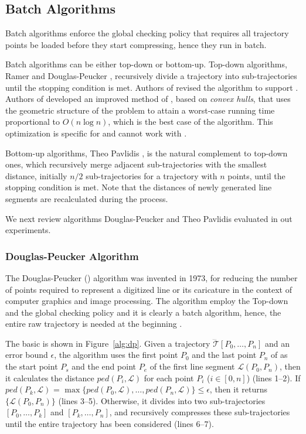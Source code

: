 \subsection{Batch Algorithms}

Batch algorithms enforce the global checking policy that requires all trajectory points be loaded before they start compressing, hence they run in batch.

Batch algorithms can be either top-down or bottom-up.
Top-down algorithms, \eg Ramer \cite{Ramer:Split} and Douglas-Peucker \cite{Douglas:Peucker}, recursively divide a trajectory into sub-trajectories until the stopping condition is met.
Authors of \cite{Meratnia:Spatiotemporal} revised the \dpa algorithm to support \sed.
Authors of \cite{Hershberger:Speeding} developed an improved method of \dpa, based on \emph{convex hulls}, that uses the geometric structure of the problem to attain a worst-case running time proportional to $O(n\log n)$, which is the best case of the \dpa algorithm. {This optimization is specific for \ped and cannot work with \sed.}

Bottom-up algorithms, \eg Theo Pavlidis \cite{Pavlidis:Segment}, is the natural complement to top-down ones, which recursively merge adjacent sub-trajectories with the smallest distance, initially $n/2$  sub-trajectories for a trajectory with $n$ points, until the stopping condition is met. Note that the distances of newly generated line segments are recalculated during the process.

We next review algorithms Douglas-Peucker and Theo Pavlidis evaluated in out experiments.
\subsubsection{Douglas-Peucker Algorithm}

The Douglas-Peucker (\dpa) algorithm \cite{Douglas:Peucker} was invented in 1973, for reducing the number of points required to represent a digitized line or its caricature in the context of computer graphics and image processing.
The \dpa algorithm employ the Top-down and the global checking policy and it is clearly a batch algorithm, hence, the entire raw trajectory is needed at the beginning \cite{Meratnia:Spatiotemporal}.

The basic \dpa is shown in Figure~\ref{alg:dp}.
Given a trajectory $\dddot{\mathcal{T}}[P_0, \ldots, P_n]$ and an error bound $\epsilon$, the algorithm uses the first point $P_0$ and the last point $P_n$ of  as the start point $P_s$ and the end point $P_e$ of the first line segment $\mathcal{L}(P_0, P_n)$, then it calculates the distance $ped(P_i, {\mathcal{L}})$ for each point $P_i$ ($i\in[0,n]$) (lines 1--2). If $ped(P_k, {\mathcal{L}})$ = $\max \{ped(P_0, {\mathcal{L}}), \ldots, ped(P_n, {\mathcal{L}}) \} \le \epsilon$, then it returns $\{\mathcal{L}(P_0,P_n)\}$ (lines 3--5). Otherwise, it divides  into two sub-trajectories $[P_0, \ldots, P_k]$ and $[P_{k}, \ldots, P_n]$, and recursively compresses these sub-trajectories until the entire trajectory has been considered (lines 6--7).


